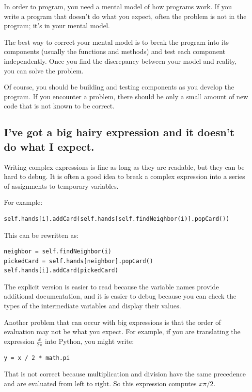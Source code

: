 \documentclass[10pt]{book}
\begin{document}
In order to program, you need a mental model of how
programs work.  If you write a program that doesn't do what you expect,
often the problem is not in the program; it's in your mental
model.

The best way to correct your mental model is to break the program
into its components (usually the functions and methods) and test
each component independently.  Once you find the discrepancy
between your model and reality, you can solve the problem.

Of course, you should be building and testing components as you
develop the program.  If you encounter a problem,
there should be only a small amount of new code
that is not known to be correct.


\subsection{I've got a big hairy expression and it doesn't
do what I expect.}

Writing complex expressions is fine as long as they are readable,
but they can be hard to debug.  It is often a good idea to
break a complex expression into a series of assignments to
temporary variables.

For example:

\begin{verbatim}
self.hands[i].addCard(self.hands[self.findNeighbor(i)].popCard())
\end{verbatim}
%
This can be rewritten as:

\begin{verbatim}
neighbor = self.findNeighbor(i)
pickedCard = self.hands[neighbor].popCard()
self.hands[i].addCard(pickedCard)
\end{verbatim}
%
The explicit version is easier to read because the variable
names provide additional documentation, and it is easier to debug
because you can check the types of the intermediate variables
and display their values.

Another problem that can occur with big expressions is
that the order of evaluation may not be what you expect.
For example, if you are translating the expression
$\frac{x}{2 \pi}$ into Python, you might write:

\begin{verbatim}
y = x / 2 * math.pi
\end{verbatim}
%
That is not correct because multiplication and division have
the same precedence and are evaluated from left to right.
So this expression computes $x \pi / 2$.
\end{document}

